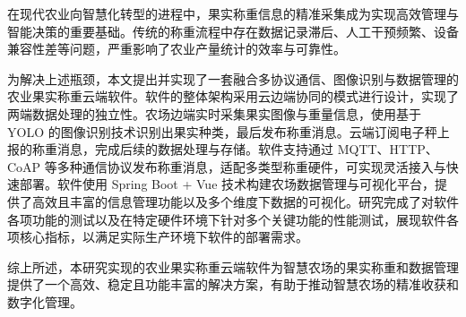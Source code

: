 在现代农业向智慧化转型的进程中，果实称重信息的精准采集成为实现高效管理与智能决策的重要基础。传统的称重流程中存在数据记录滞后、人工干预频繁、设备兼容性差等问题，严重影响了农业产量统计的效率与可靠性。

为解决上述瓶颈，本文提出并实现了一套融合多协议通信、图像识别与数据管理的农业果实称重云端软件。软件的整体架构采用云边端协同的模式进行设计，实现了两端数据处理的独立性。农场边端实时采集果实图像与重量信息，使用基于 YOLO 的图像识别技术识别出果实种类，最后发布称重消息。云端订阅电子秤上报的称重消息，完成后续的数据处理与存储。软件支持通过 MQTT、HTTP、CoAP 等多种通信协议发布称重消息，适配多类型称重硬件，可实现灵活接入与快速部署。软件使用 Spring Boot + Vue 技术构建农场数据管理与可视化平台，提供了高效且丰富的信息管理功能以及多个维度下数据的可视化。研究完成了对软件各项功能的测试以及在特定硬件环境下针对多个关键功能的性能测试，展现软件各项核心指标，以满足实际生产环境下软件的部署需求。

综上所述，本研究实现的农业果实称重云端软件为智慧农场的果实称重和数据管理提供了一个高效、稳定且功能丰富的解决方案，有助于推动智慧农场的精准收获和数字化管理。 
